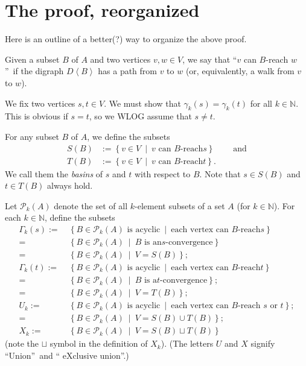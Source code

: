 \documentclass[numbers=enddot,12pt,final,onecolumn,notitlepage]{scrartcl}%
\theoremstyle{definition}
\theoremstyle{plainsl}
\begin{document}
\section{The proof, reorganized}

Here is an outline of a better(?) way to organize the above proof.

Given a subset $B$ of $A$ and two vertices $v,w\in V$, we say that
\textquotedblleft$v$ can $B$-reach $w$\textquotedblright\ if the digraph
$D\left\langle B\right\rangle $ has a path from $v$ to $w$ (or, equivalently,
a walk from $v$ to $w$).

We fix two vertices $s,t\in V$. We must show that $\gamma_{k}\left(  s\right)
=\gamma_{k}\left(  t\right)  $ for all $k\in\mathbb{N}$. This is obvious if
$s=t$, so we WLOG assume that $s\neq t$.

For any subset $B$ of $A$, we define the subsets%
\begin{align*}
S\left(  B\right)    & :=\left\{  v\in V\ \mid\ v\text{ can }B\text{-reach
}s\right\}  \ \ \ \ \ \ \ \ \ \ \text{and}\\
T\left(  B\right)    & :=\left\{  v\in V\ \mid\ v\text{ can }B\text{-reach
}t\right\}  .
\end{align*}
We call them the \emph{basins} of $s$ and $t$ with respect to $B$. Note that
$s\in S\left(  B\right)  $ and $t\in T\left(  B\right)  $ always hold.

Let $\mathcal{P}_{k}\left(  A\right)  $ denote the set of all $k$-element
subsets of a set $A$ (for $k\in\mathbb{N}$). For each $k\in\mathbb{N}$, define
the subsets
\begin{align*}
\Gamma_{k}\left(  s\right)  := &  \ \left\{  B\in\mathcal{P}_{k}\left(
A\right)  \text{ is acyclic}\ \mid\ \text{each vertex can }B\text{-reach
}s\right\}  \\
= &  \ \left\{  B\in\mathcal{P}_{k}\left(  A\right)  \ \mid\ B\text{ is an
}s\text{-convergence}\right\}  \\
= &  \ \left\{  B\in\mathcal{P}_{k}\left(  A\right)  \ \mid\ V=S\left(
B\right)  \right\}  ;\\
\Gamma_{k}\left(  t\right)  := &  \ \left\{  B\in\mathcal{P}_{k}\left(
A\right)  \text{ is acyclic}\ \mid\ \text{each vertex can }B\text{-reach
}t\right\}  \\
= &  \ \left\{  B\in\mathcal{P}_{k}\left(  A\right)  \ \mid\ B\text{ is a
}t\text{-convergence}\right\}  ;\\
= &  \ \left\{  B\in\mathcal{P}_{k}\left(  A\right)  \ \mid\ V=T\left(
B\right)  \right\}  ;\\
U_{k}:= &  \ \left\{  B\in\mathcal{P}_{k}\left(  A\right)  \text{ is
acyclic}\ \mid\ \text{each vertex can }B\text{-reach }s\text{ or }t\right\}
;\\
= &  \ \left\{  B\in\mathcal{P}_{k}\left(  A\right)  \ \mid\ V=S\left(
B\right)  \cup T\left(  B\right)  \right\}  ;\\
X_{k}:= &  \ \left\{  B\in\mathcal{P}_{k}\left(  A\right)  \ \mid\ V=S\left(
B\right)  \sqcup T\left(  B\right)  \right\}
\end{align*}
(note the $\sqcup$ symbol in the definition of $X_{k}$). (The letters $U$ and
$X$ signify \textquotedblleft Union\textquotedblright\ and \textquotedblleft
eXclusive union\textquotedblright.)
\end{document}
